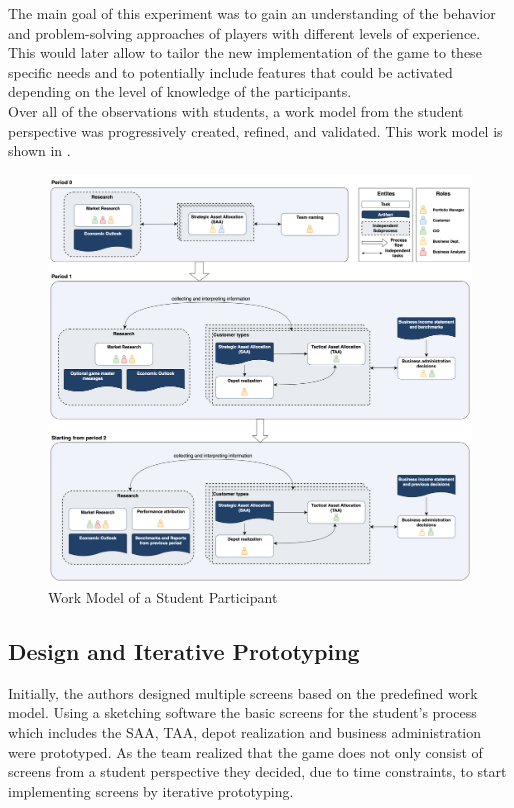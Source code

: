 The main goal of this experiment was to gain an understanding of the behavior and problem-solving approaches of players with different levels of experience. This would later allow to tailor the new implementation of the game to these specific needs and to potentially include features that could be activated depending on the level of knowledge of the participants. \\

Over all of the observations with students, a work model from the student perspective was progressively created, refined, and validated. This work model is shown in .

\begin{figure}[h!]
  \centering
  \includegraphics[scale=0.25]{img/work_model_pfm_game.png}
  \caption{Work Model of a Student Participant}
  \label{fig:work_model_student}
\end{figure}


\subsection{Design and Iterative Prototyping}
Initially, the authors designed multiple screens based on the predefined work model. Using a sketching software the basic screens for the student's process which includes the SAA, TAA, depot realization and business administration were prototyped. As the team realized that the game does not only consist of screens from a student perspective they decided, due to time constraints, to start implementing screens by iterative prototyping. \\

